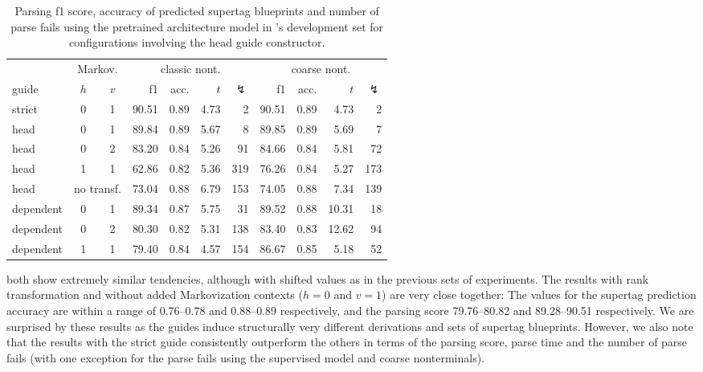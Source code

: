 \documentclass[../../document.tex]{subfiles}
\begin{document}
    \begin{table}
        \caption{\label{tbl:gridsearch:head:3}
        Parsing f1 score, accuracy of predicted supertag blueprints and number of parse fails using the pretrained architecture model in \negra{}'s development set for configurations involving the head guide constructor.
        }
        \centering
        \vspace{.2cm}
        \begin{tabular}{lcc|rrrr|rrrr}
            \toprule
                    & \multicolumn{2}{c|}{Markov.} & \multicolumn{4}{c|}{classic nont.} &  \multicolumn{4}{c}{coarse nont.} \\
                    guide           & \(h\) & \(v\) & f1 & acc. & $t$ & $\lightning$ & f1 & acc. & $t$ & $\lightning$  \\ \hline \rowcolor{black!10}
strict & 0 & 1                         & 90.51 & 0.89 & 4.73 &   2 & 90.51 & 0.89 &  4.73 &   2 \\\hline
head & 0 & 1                           & 89.84 & 0.89 & 5.67 &   8 & 89.85 & 0.89 &  5.69 &   7 \\
head & 0 & 2                           & 83.20 & 0.84 & 5.26 &  91 & 84.66 & 0.84 &  5.81 &  72 \\
head & 1 & 1                           & 62.86 & 0.82 & 5.36 & 319 & 76.26 & 0.84 &  5.27 & 173 \\
head & \multicolumn{2}{c|}{no transf.} & 73.04 & 0.88 & 6.79 & 153 & 74.05 & 0.88 &  7.34 & 139 \\\hline
dependent & 0 & 1                      & 89.34 & 0.87 & 5.75 &  31 & 89.52 & 0.88 & 10.31 &  18 \\
dependent & 0 & 2                      & 80.30 & 0.82 & 5.31 & 138 & 83.40 & 0.83 & 12.62 &  94 \\
dependent & 1 & 1                      & 79.40 & 0.84 & 4.57 & 154 & 86.67 & 0.85 &  5.18 &  52 \\
\hline
\bottomrule
        \end{tabular}
    \end{table}

     both show extremely similar tendencies, although with shifted values as in the previous sets of experiments.
    The results with rank transformation and without added Markovization contexts ($h=0$ and $v=1$) are very close together:
        The values for the supertag prediction accuracy are within a range of 0.76--0.78 and 0.88--0.89 respectively, and the parsing score 79.76--80.82 and 89.28--90.51 respectively.
    We are surprised by these results as the guides induce structurally very different derivations and sets of supertag blueprints.
    However, we also note that the results with the strict guide consistently outperform the others in terms of the parsing score, parse time and the number of parse fails (with one exception for the parse fails using the supervised model and coarse nonterminals).
\end{document}
